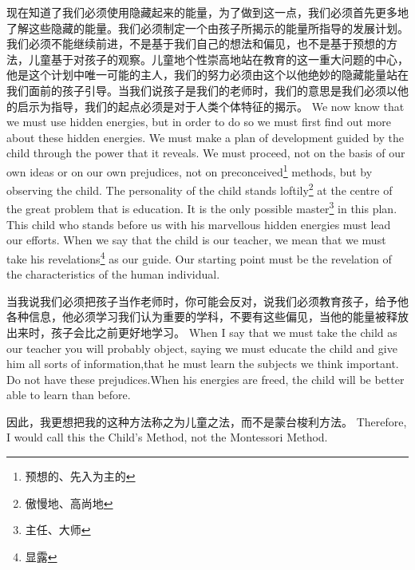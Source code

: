 \documentclass[lang=cn,10pt]{elegantbook}
\begin{document}
\begin{tcolorbox}[title=译文,
colback=red!5!white,
colframe=red!75!black,
fonttitle=\bfseries]
现在知道了我们必须使用隐藏起来的能量，为了做到这一点，我们必须首先更多地了解这些隐藏的能量。我们必须制定一个由孩子所揭示的能量所指导的发展计划。我们必须不能继续前进，不是基于我们自己的想法和偏见，也不是基于预想的方法，儿童基于对孩子的观察。儿童地个性崇高地站在教育的这一重大问题的中心，他是这个计划中唯一可能的主人，我们的努力必须由这个以他绝妙的隐藏能量站在我们面前的孩子引导。当我们说孩子是我们的老师时，我们的意思是我们必须以他的启示为指导，我们的起点必须是对于人类个体特征的揭示。
We now know that we must use hidden energies, but in order to do so we must first find out more about these hidden energies. We must make a plan of development guided by the child through the power that it reveals. We must proceed, not on the basis of our own ideas or on our own prejudices, not on preconceived\footnote{预想的、先入为主的} methods, but by observing the child. The personality of the child stands loftily\footnote{傲慢地、高尚地} at the centre of the great problem that is education. It is the only possible master\footnote{主任、大师} in this plan. This child who stands before us with his marvellous hidden energies must lead our efforts. When we say that the child is our teacher, we mean that we must take his revelations\footnote{显露} as our guide. Our starting point must be the revelation of the characteristics of the human individual.
\end{tcolorbox}

\begin{tcolorbox}[title=译文,
colback=red!5!white,
colframe=red!75!black,
fonttitle=\bfseries]
当我说我们必须把孩子当作老师时，你可能会反对，说我们必须教育孩子，给予他各种信息，他必须学习我们认为重要的学科，不要有这些偏见，当他的能量被释放出来时，孩子会比之前更好地学习。
When I say that we must take the child as our teacher you will probably object, saying we must educate the child and give him all sorts of information,that he must learn the subjects we think important. Do not have these prejudices.When his energies are freed, the child will be better able to learn than before.
\end{tcolorbox}

\begin{tcolorbox}[title=译文,
colback=red!5!white,
colframe=red!75!black,
fonttitle=\bfseries]
因此，我更想把我的这种方法称之为儿童之法，而不是蒙台梭利方法。
Therefore, I would call this the Child's Method, not the Montessori Method.
\end{tcolorbox}
\end{document}
